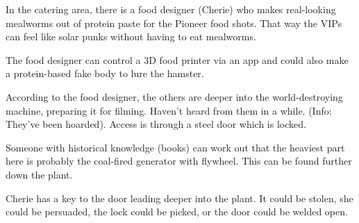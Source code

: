In the catering area, there is a food designer (Cherie) who makes real-looking mealworms out of protein paste for the Pioneer food shots.  That way the VIPs can feel like solar punks without having to eat mealworms.

The food designer can control a 3D food printer via an app and could also make a protein-based fake body to lure the hamster.

According to the food designer, the others are deeper into the world-destroying machine, preparing it for filming. Haven't heard from them in a while. (Info: They've been hoarded). Access is through a steel door which is locked.

Someone with historical knowledge (books) can work out that the heaviest part here is probably the coal-fired generator with flywheel. This can be found further down the plant.

Cherie has a key to the door leading deeper into the plant. It could be stolen, she could be persuaded, the lock could be picked, or the door could be welded open.


